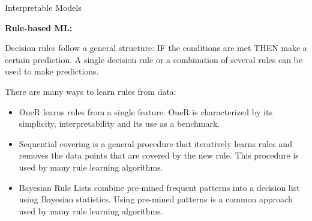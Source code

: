 \documentclass[11pt,compress,t,notes=noshow, xcolor=table]{beamer}
\begin{document}
\begin{vbframe}{Interpretable Models}


\textbf{Rule-based ML:}


Decision rules follow a general structure: IF the conditions are met THEN make a certain prediction. A single decision rule or a combination of several rules can be used to make predictions.

\vspace{0.5cm}
There are many ways to learn rules from data:
\begin{itemize}
\item OneR learns rules from a single feature. OneR is characterized by its simplicity, interpretability and its use as a benchmark.
\item Sequential covering is a general procedure that iteratively learns rules and removes the data points that are covered by the new rule. This procedure is used by many rule learning algorithms.
\item Bayesian Rule Lists combine pre-mined frequent patterns into a decision list using Bayesian statistics. Using pre-mined patterns is a common approach used by many rule learning algorithms.
\end{itemize}

\end{vbframe}


\endlecture
\end{document}
